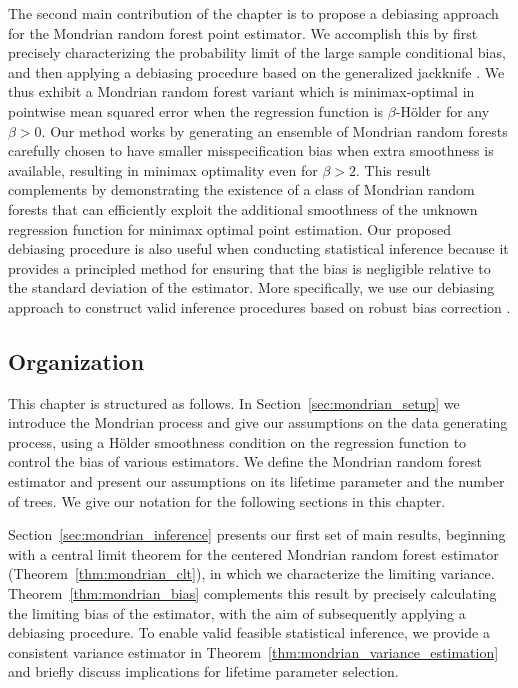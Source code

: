 The second main contribution of the chapter is to propose a debiasing approach
for the Mondrian random forest point estimator. We accomplish this by first
precisely characterizing the probability limit of the large sample conditional
bias, and then applying a debiasing procedure based on the generalized
jackknife \citep{schucany1977improvement}. We thus exhibit a Mondrian random
forest variant which is minimax-optimal in pointwise mean squared error when
the regression function is $\beta$-H{\"o}lder for any $\beta > 0$. Our method
works by generating an ensemble of Mondrian random forests carefully chosen to
have smaller misspecification bias when extra smoothness is available,
resulting in minimax optimality even for $\beta > 2$. This result complements
\citet{mourtada2020minimax} by demonstrating the existence of a class of
Mondrian random forests that can efficiently exploit the additional smoothness
of the unknown regression function for minimax optimal point estimation. Our
proposed debiasing procedure is also useful when conducting statistical
inference because it provides a principled method for ensuring that the bias is
negligible relative to the standard deviation of the estimator. More
specifically, we use our debiasing approach to construct valid inference
procedures based on robust bias correction
\citep{calonico2018effect,calonico2022coverage}.

\subsection{Organization}

This chapter is structured as follows. In Section~\ref{sec:mondrian_setup} we
introduce the Mondrian process and give our assumptions on the data generating
process, using a H{\"o}lder smoothness condition on the regression function to
control the bias of various estimators. We define the Mondrian random forest
estimator and present our assumptions on its lifetime parameter and the number
of trees. We give our notation for the following sections in this chapter.

Section~\ref{sec:mondrian_inference} presents our first set of main results,
beginning with a central limit theorem for the centered Mondrian random forest
estimator (Theorem~\ref{thm:mondrian_clt}), in which we characterize the
limiting
variance. Theorem~\ref{thm:mondrian_bias} complements this result by precisely
calculating the limiting bias of the estimator, with the aim of subsequently
applying a debiasing procedure. To enable valid feasible statistical inference,
we provide a consistent variance estimator in
Theorem~\ref{thm:mondrian_variance_estimation} and briefly discuss implications
for
lifetime parameter selection.

